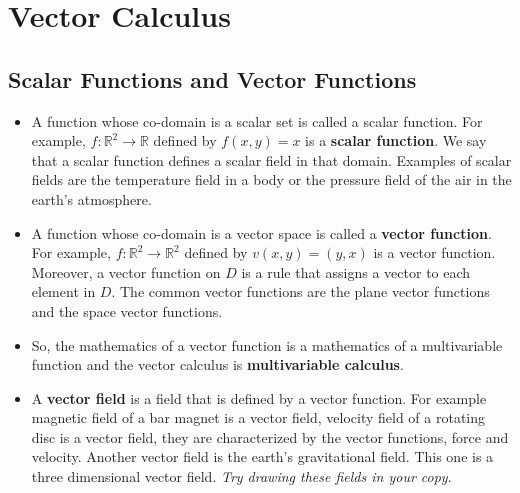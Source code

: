\documentclass[aima331_lecturenotes_ku.tex]{subfiles}
\begin{document}
\section{Vector Calculus}
\subsection{Scalar Functions and Vector Functions}
\begin{itemize}
\item A function whose co-domain is a scalar set is called a scalar function. For example, $f: \mathbb{R}^2 \to \mathbb{R}$ defined by $f(x,y)=x$ is a \textbf{scalar function}. We say that a scalar function defines a scalar field in that domain. Examples of scalar fields are the temperature field in a body or the pressure field of the air in the earth's atmosphere.

\item A function whose co-domain is a vector space is called a \textbf{vector function}. For example, $f: \mathbb{R}^2 \to \mathbb{R}^2$ defined by $v(x,y)=(y,x)$ is a vector function. Moreover, a vector function on $D$ is a rule that assigns a vector to each element in $D$. The common vector functions are the plane vector functions and the space vector functions.

\item So, the mathematics of a vector function is a mathematics of a multivariable function and the vector calculus is \textbf{multivariable calculus}.

\item A \textbf{vector field} is a field that is defined by a vector function. For example magnetic field of a bar magnet is a vector field, velocity field of a rotating disc is a vector field, they are characterized by the vector functions, force and velocity. Another vector field is the earth's gravitational field. This one is a three dimensional vector field. \textit{Try drawing these fields in your copy}.
\end{itemize}
\end{document}
